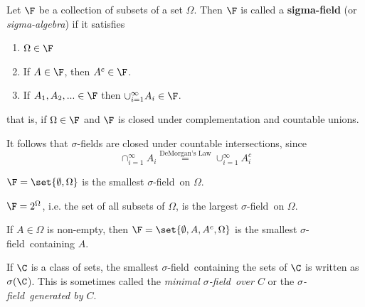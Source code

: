 \documentclass{article} %
\renewcommand{\sf}{$\sigma$-field}
\newcommand{\sfs}{$\sigma$-fields}
\begin{document}


\begin{definition}
Let $\F$ be a collection of subsets of a set $\Omega$.  Then $\F$ is called a \textbf{sigma-field} (or \textit{sigma-algebra}) if it satisfies

\begin{enumerate}[label=\alph*)]
	\item $\Omega \in \F$ 
	\item If $A \in \F$, then $A^c \in \F$.
	\item If $A_1,A_2, ... \in \F$ then $\cup_{i=1}^\infty A_i \in \F$.  
\end{enumerate}
that is, if $\Omega \in \F$ and $\F$ is closed under complementation and countable unions.
\label{def:sigma_field}	
\end{definition}

\begin{remark}
It follows that $\sigma$-fields are closed under countable intersections, since
\[ \cap_{i=1}^\infty A_i \stackrel{\text{DeMorgan's Law}}{=} \cup_{i=1}^\infty A_i^c \]	
\end{remark}

\begin{example}
$\F =\set{\emptyset, \Omega}$ is the smallest \sf\ on $\Omega$. 
\end{example}

\begin{example}
	$\F =2^\Omega$, i.e. the set of all subsets of $\Omega$, is the largest \sf\ on $\Omega$.
\end{example}

\begin{example}
If $A \in \Omega$ is non-empty, then $\F = \set{\emptyset, A, A^c, \Omega}$ is the smallest \sf\ containing $A$.
\end{example}

\begin{notation}
If $\C$ is a class of sets, the smallest \sf\ containing the sets of $\C$ is written as $\sigma(\C$).  This is sometimes called the \textit{minimal \sf\ over $C$} or the \textit{\sf\ generated by $C$}. 
\end{notation}
	
\end{document}
